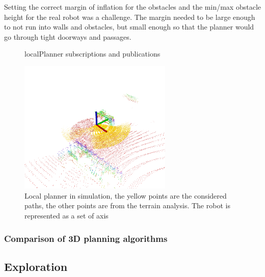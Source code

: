 \documentclass[12pt]{article}
\begin{document}
        Setting the correct margin of inflation for the obstacles and the min/max obstacle height for the real robot was a challenge. The margin needed to be large enough to not run into walls and obstacles, but small enough so that the planner would go through tight doorways and passages. 

        
        \begin{figure}[h]
            \centering
            \resizebox{0.6\textwidth}{!}{%
            
            }   
            \caption{localPlanner subscriptions and publications}
            \label{fig:local_planner}
        \end{figure}
        
        \begin{figure}[h!]
            \centering
            \includegraphics[width=0.65\textwidth]{Images/localPlannerSimCropped.png}
            \caption{Local planner in simulation, the yellow points are the considered paths, the other points are from the terrain analysis. The robot is represented as a set of axis}
            \label{fig:local_planner_sim}
        \end{figure}
        
        
        
        \subsubsection{Comparison of 3D planning algorithms}

        

    \subsection{Exploration}
\end{document}
